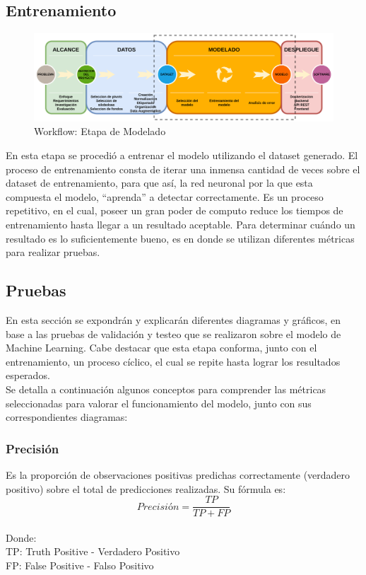 \subsection{Entrenamiento}
\begin{figure}
    \centering
    \includegraphics[width=1.2\textwidth,center]{img/Wokflow - modelado.drawio.png}
    \caption{Workflow: Etapa de Modelado}
    \label{fig:workflow - modelado}
\end{figure}
En esta etapa se procedió a entrenar el modelo utilizando el dataset generado. El proceso de entrenamiento consta de iterar una inmensa cantidad de veces sobre el dataset de entrenamiento, para que así, la red neuronal por la que esta compuesta el modelo, ``aprenda'' a detectar correctamente. Es un proceso repetitivo, en el cual, poseer un gran poder de computo reduce los tiempos de entrenamiento hasta llegar a un resultado aceptable. Para determinar cuándo un resultado es lo suficientemente bueno, es en donde se utilizan diferentes métricas para realizar pruebas.


\subsection{Pruebas}
En esta sección se expondrán y explicarán diferentes diagramas y gráficos, en base a las pruebas de validación y testeo que se realizaron sobre el modelo de Machine Learning. Cabe destacar que esta etapa conforma, junto con el entrenamiento, un proceso cíclico, el cual se repite hasta lograr los resultados esperados. \\
Se detalla a continuación algunos conceptos para comprender las métricas seleccionadas para valorar el funcionamiento del modelo, junto con sus correspondientes diagramas:

\subsubsection{Precisión}
Es la proporción de observaciones positivas predichas correctamente (verdadero positivo) sobre el total de predicciones realizadas. Su fórmula es:  \[Precisión=\frac{TP}{TP + FP}\]
\\
Donde:\\
TP: Truth Positive - Verdadero Positivo\\
FP: False Positive - Falso Positivo\\

